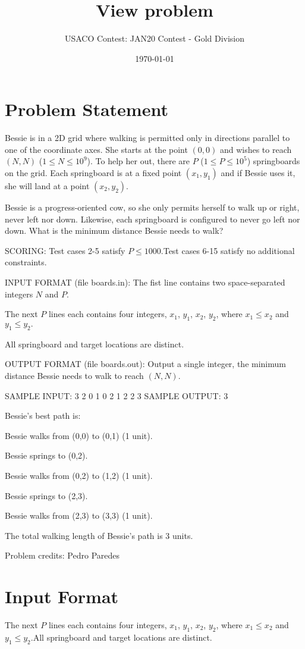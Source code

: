 \documentclass[12pt]{article}
\title{View problem}
\author{USACO Contest: JAN20 Contest - Gold Division}
\date{\today}
\begin{document}
\maketitle

\section*{Problem Statement}

Bessie is in a 2D grid where walking is permitted only in directions parallel to
one of the coordinate axes. She starts at the point $(0,0)$ and wishes to reach
$(N,N)$ ($1\le N\le 10^9$). To help her out, there are $P$ ($1\le P\le 10^5$)
springboards on the grid. Each springboard is at a fixed point $(x_1,y_1)$ and
if Bessie uses it, she will land at a point
$(x_2,y_2)$.

Bessie is a progress-oriented cow, so she only permits herself to walk up or
right, never left nor down. Likewise, each springboard is configured to never go
left nor down. What is the minimum distance Bessie needs to walk?

SCORING:
Test cases 2-5 satisfy $P \le 1000$.Test cases 6-15 satisfy no additional constraints.

INPUT FORMAT (file boards.in):
The fist line contains two space-separated integers $N$ and $P$.

The next $P$ lines each contains four integers, $x_1$, $y_1$, $x_2$, $y_2$,
where $x_1 \le x_2$ and $y_1 \le y_2.$

All springboard and target locations are distinct.

OUTPUT FORMAT (file boards.out):
Output a single integer, the minimum distance Bessie needs to walk to reach
$(N,N)$.

SAMPLE INPUT:
3 2
0 1 0 2
1 2 2 3
SAMPLE OUTPUT: 
3

Bessie's best path is:

Bessie walks from (0,0) to (0,1) (1 unit).

Bessie springs to (0,2).

Bessie walks from (0,2) to (1,2) (1 unit).

Bessie springs to (2,3).

Bessie walks from (2,3) to (3,3) (1 unit).

The total walking length of Bessie's path is 3 units.


Problem credits: Pedro Paredes



\section*{Input Format}
The next $P$ lines each contains four integers, $x_1$, $y_1$, $x_2$, $y_2$,
where $x_1 \le x_2$ and $y_1 \le y_2.$All springboard and target locations are distinct.
\end{document}
